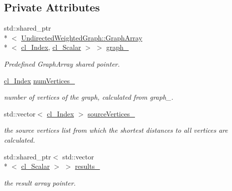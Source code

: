 \subsection*{Private Attributes}
\begin{DoxyCompactItemize}
\item 
std\+::shared\+\_\+ptr\\*
$<$ \hyperlink{struct_undirected_weighted_graph_1_1_graph_array}{Undirected\+Weighted\+Graph\+::\+Graph\+Array}\\*
$<$ \hyperlink{class_dijkstra_1_1_dijkstra_c_l_aab92585b062690f0835f154dc28f8c04}{cl\+\_\+\+Index}, \hyperlink{class_dijkstra_1_1_dijkstra_c_l_a5dc96724577a49ee14d4c2e1df3c0579}{cl\+\_\+\+Scalar} $>$ $>$ \hyperlink{class_dijkstra_1_1_dijkstra_c_l_a0b851e99d9aed1cc0671fc537efe3a20}{graph\+\_\+}
\begin{DoxyCompactList}\small\item\em Predefined Graph\+Array shared pointer. \end{DoxyCompactList}\item 
\hyperlink{class_dijkstra_1_1_dijkstra_c_l_aab92585b062690f0835f154dc28f8c04}{cl\+\_\+\+Index} \hyperlink{class_dijkstra_1_1_dijkstra_c_l_a282256a0fd3793379edae35783130833}{num\+Vertices\+\_\+}
\begin{DoxyCompactList}\small\item\em number of vertices of the graph, calculated from graph\+\_\+. \end{DoxyCompactList}\item 
std\+::vector$<$ \hyperlink{class_dijkstra_1_1_dijkstra_c_l_aab92585b062690f0835f154dc28f8c04}{cl\+\_\+\+Index} $>$ \hyperlink{class_dijkstra_1_1_dijkstra_c_l_ae0327784ad33bc8cbd5c2c47e067d178}{source\+Vertices\+\_\+}
\begin{DoxyCompactList}\small\item\em the source vertices list from which the shortest distances to all vertices are calculated. \end{DoxyCompactList}\item 
std\+::shared\+\_\+ptr$<$ std\+::vector\\*
$<$ \hyperlink{class_dijkstra_1_1_dijkstra_c_l_a5dc96724577a49ee14d4c2e1df3c0579}{cl\+\_\+\+Scalar} $>$ $>$ \hyperlink{class_dijkstra_1_1_dijkstra_c_l_a51a092b08954b8a30b90514f86520b03}{results\+\_\+}
\begin{DoxyCompactList}\small\item\em the result array pointer. \end{DoxyCompactList}\item 

\end{DoxyCompactItemize}
